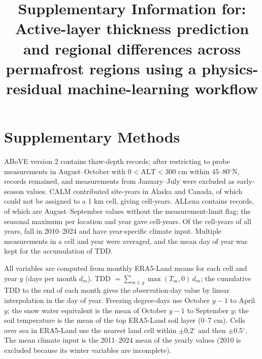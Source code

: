 \documentclass[pdflatex,sn-nature]{sn-jnl}
\begin{document}
\title{Supplementary Information for: Active-layer thickness prediction and regional differences across permafrost regions using a physics-residual machine-learning workflow}
\author[1]{ }
\maketitle

\section{Supplementary Methods}

ABoVE version 2\cite{Moore2025} contains \nqcAboveRaw{} thaw-depth records; after restricting to probe measurements in August--October with $0<\mathrm{ALT}<300$ cm within 45--80$^\circ$N, \nqcAboveKept{} records remained, and \nqcAboveEarly{} measurements from January--July were excluded as early-season values. CALM\cite{Streletskiy2025} contributed \nqcCalmSy{} site-years in Alaska and Canada, of which \nqcCalmNoloc{} could not be assigned to a 1 km cell, giving \nqcCalmCy{} cell-years. ALLena\cite{Veremeeva2025} contains \nqcLenaRaw{} records, of which \nqcLenaEos{} are August--September values without the measurement-limit flag; the seasonal maximum per location and year gave \nqcLenaCy{} cell-years. Of the \nqcTotalCy{} cell-years of all years, \nqcTotalCyIn{} fall in 2010--2024 and have year-specific climate input. Multiple measurements in a cell and year were averaged, and the mean day of year was kept for the accumulation of TDD.

All variables are computed from monthly ERA5-Land means for each cell and year $y$ (days per month $d_m$). TDD $=\sum_{m\in y}\max(T_m,0)\,d_m$; the cumulative TDD to the end of each month gives the observation-day value by linear interpolation in the day of year. Freezing degree-days use October $y-1$ to April $y$; the snow water equivalent is the mean of October $y-1$ to September $y$; the soil temperature is the mean of the top ERA5-Land soil layer (0--7 cm). Cells over sea in ERA5-Land use the nearest land cell within $\pm$0.2$^\circ$ and then $\pm$0.5$^\circ$. The mean climate input is the 2011--2024 mean of the yearly values (2010 is excluded because its winter variables are incomplete).
\end{document}
